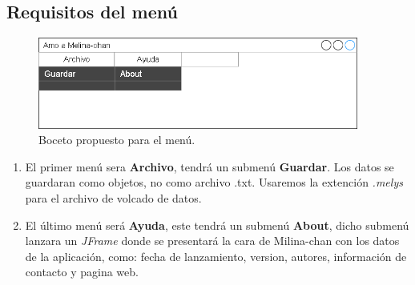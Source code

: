 		\subsection{Requisitos del menú}
			\begin{figure}[h]
			\centering
				\includegraphics[height=3cm]{img/gui_menu}
				\caption{Boceto propuesto para el menú.}		
				\label{Pestaña menú}
			\end{figure}
			\begin{enumerate}
				\item El primer menú sera \textbf{Archivo}, tendrá un submenú \textbf{Guardar}. Los datos se guardaran como objetos, no como archivo .txt. Usaremos la extención \textit{.melys} para el archivo de volcado de datos.
				\item El último menú será \textbf{Ayuda}, este tendrá un submenú \textbf{About}, dicho submenú lanzara un \textit{JFrame} donde se presentará la cara de Milina-chan con los datos de la aplicación, como: fecha de lanzamiento, version, autores, información de contacto y pagina web. 
			\end{enumerate}